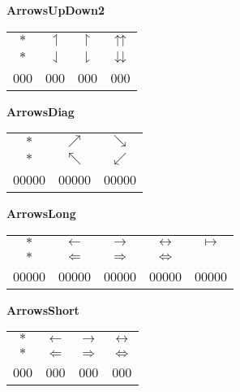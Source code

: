 \documentclass[12pt]{report}
\newlength{\mine}
\newlength{\niz}
\def\pmb{}
\begin{document}
\textbf{ArrowsUpDown2}
\par\nobreak\vspace{2mm}
\begin{tabular}{|c|ccc|}
  \hline
   $\pmb *                $&
   $\pmb\upharpoonleft    $&
   $\pmb\upharpoonright   $&
   $\pmb\upuparrows       $\\[\mine]
   $\pmb *                $&
   $\pmb\downharpoonleft  $&
   $\pmb\downharpoonright $&
   $\pmb\downdownarrows   $\\[\niz]
  \hline\hline
  000&000&000&000\\
  \hline
\end{tabular}
\goodbreak\par\vspace{3mm}

\textbf{ArrowsDiag}
\par\nobreak\vspace{2mm}
\begin{tabular}{|c|cc|}
  \hline
   $\pmb *               $&
   $\pmb\nearrow         $&
   $\pmb\searrow         $\\[\mine]
   $\pmb *               $&
   $\pmb\nwarrow         $&
   $\pmb\swarrow         $\\[\niz]
  \hline\hline
  00000&00000&00000\\
  \hline
\end{tabular}
\goodbreak\par\vspace{3mm}

\textbf{ArrowsLong}
\par\nobreak\vspace{2mm}
\begin{tabular}{|c|cccc|}
  \hline
   $\pmb *                  $&
   $\pmb\longleftarrow      $&
   $\pmb\longrightarrow     $&
   $\pmb\longleftrightarrow $&
   $\pmb\longmapsto         $\\[\mine]
   $\pmb *                  $&
   $\pmb\Longleftarrow      $&
   $\pmb\Longrightarrow     $&
   $\pmb\Longleftrightarrow $&
   $                        $\\[\niz]
  \hline\hline
  00000&00000&00000&00000&00000\\
  \hline
\end{tabular}
\goodbreak\par\vspace{3mm}

\newpage

\textbf{ArrowsShort}
\par\nobreak\vspace{2mm}
\begin{tabular}{|c|ccc|}
  \hline
   $\pmb *              $&
   $\pmb\leftarrow      $&
   $\pmb\rightarrow     $&
   $\pmb\leftrightarrow $\\[\mine]
   $\pmb *              $&
   $\pmb\Leftarrow      $&
   $\pmb\Rightarrow     $&
   $\pmb\Leftrightarrow $\\[\niz]
  \hline\hline
  000&000&000&000\\
  \hline
\end{tabular}
\goodbreak\par\vspace{3mm}
\end{document}
